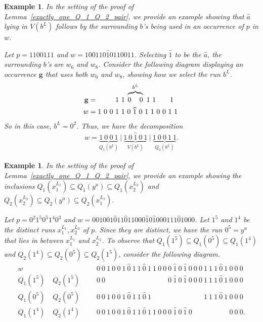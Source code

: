 \documentclass[11pt]{amsart}
\newtheorem{ex}[theorem]{Example}
\newcommand{\hatted}[1]{\widehat{#1}}
\begin{document}
\begin{ex}\label{exactly_one_part_one_ex}
    \normalfont In the setting of the proof of Lemma~\ref{exactly_one_Q_1_Q_2_pair}, we provide an example showing that $\hatted{a}$ lying in $V(b^L)$ follows by the surrounding $b$'s being used in an occurrence of $p$ in $w$. 
    
    Let $p=1100111$ and $w=100110\hatted{1}0110011$. Selecting $\hatted{1}$ to be the $\hatted{a}$, the surrounding $b$'s are $w_6$ and $w_8$. Consider the following diagram displaying an occurrence $\mathbf{g}$ that uses both $w_6$ and $w_8$, showing how we select the run $b^L$.
    \begin{align*}
        \mathbf{g}&=\phantom{1~0~0}~1~1\hspace{0.25em}\overbrace{0~\phantom{\hatted{1}}~0}^{b^L}~1~1~\phantom{0~0}~1~\phantom{1}\\
        w&=1~0~0~1~1~{0}~{\hatted{1}}~{0}~1~1~0~0~1~1
    \end{align*}
    So in this case, $b^L=0^2$. Thus, we have the decomposition
    \begin{align*}
        w=\underbrace{1~0~0~1}_{Q_1(b^L)}~\Big|~\underbrace{1~{0}~{\hatted{1}}~{0}~1}_{V(b^L)}~\Big|~\underbrace{1~0~0~1~1}_{Q_2(b^L)}.
    \end{align*}
\end{ex}

\begin{ex}\label{exactly_one_part_two_ex}
    \normalfont In the setting of the proof of Lemma~\ref{exactly_one_Q_1_Q_2_pair}, we provide an example showing the inclusions $Q_1(x_1^{L_1})\subseteq Q_1(y^u)\subseteq Q_1(x_2^{L_2})$ and $Q_2(x_2^{L_2})\subseteq Q_2(y^u)\subseteq Q_2(x_1^{L_1})$.
    
    Let $p=0^2 1^5 0^5 1^4 0^3$ and $w=001001\hatted{0}11\hatted{0}11000\hatted{1}0\hatted{1}000111\hatted{0}1000$. Let $1^5$ and $1^4$ be the distinct runs $x_1^{L_1},x_2^{L_2}$ of $p$. Since they are distinct, we have the run $0^5=y^u$ that lies in between $x_1^{L_1}$ and $x_2^{L_2}$. To observe that $Q_1(1^5)\subseteq Q_1(0^5)\subseteq Q_1(1^4)$ and $Q_2(1^4)\subseteq Q_2(0^5)\subseteq Q_2(1^5)$, consider the following diagram.
    \begin{align*}
        w\phantom{aaaaaa}&\phantom{\rightarrow}0~0~1~0~0~1~\hatted{0}~1~1~\hatted{0}~1~1~0~0~0~\hatted{1}~0~\hatted{1}~0~0~0~1~1~1~\hatted{0}~1~0~0~0\\
        Q_1(1^5)\phantom{aa}Q_2(1^5)&\phantom{\rightarrow}0~0\phantom{~1~0~0~1~\hatted{0}~1~1~\hatted{0}~1~1~0~0~}0~\hatted{1}~0~\hatted{1}~0~0~0~1~1~1~\hatted{0}~1~0~0~0\\
        Q_1(0^5)\phantom{aa}Q_2(0^5)&\phantom{\rightarrow}0~0~1~0~0~1~\hatted{0}~1~1~\hatted{0}~1\phantom{~1~0~0~0~\hatted{1}~0~\hatted{1}~0~0~0}~1~1~1~\hatted{0}~1~0~0~0\\
        Q_1(1^4)\phantom{aa}Q_2(1^4)&\phantom{\rightarrow}0~0~1~0~0~1~\hatted{0}~1~1~\hatted{0}~1~1~0~0~0~\hatted{1}~0~\hatted{1}~0\phantom{~0~0~1~1~1~\hatted{0}~1}~0~0~0.
    \end{align*}
\end{ex}
\end{document}
